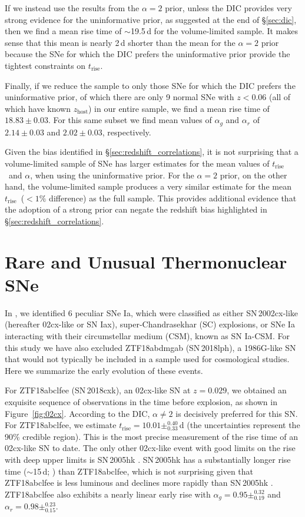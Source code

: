 \documentclass[twocolumn]{./aastex63}
\newcommand{\trise}{$t_\mathrm{rise}$}
\begin{document}
If we instead use the results from the $\alpha = 2$ prior, unless the DIC
provides very strong evidence for the uninformative prior, as suggested at the
end of \S\ref{sec:dic}, then we find a mean rise time of $\sim$19.5\,d for the
volume-limited sample. It makes sense that this mean is nearly 2\,d shorter
than the mean for the $\alpha=2$ prior because the SNe for which the DIC
prefers the uninformative prior provide the tightest constraints on \trise.

Finally, if we reduce the sample to only those SNe for which the DIC prefers
the uninformative prior, of which there are only 9 normal SNe with $z < 0.06$
(all of which have known $z_\mathrm{host}$) in our entire sample, we find a
mean rise time of $18.83 \pm 0.03$. For this same subset we find mean values
of $\alpha_g$ and $\alpha_r$ of $2.14 \pm 0.03$ and $2.02 \pm 0.03$,
respectively.

Given the bias identified in \S\ref{sec:redshift_correlations}, it is not
surprising that a volume-limited sample of SNe has larger estimates for the
mean values of \trise\ and $\alpha$, when using the uninformative prior. For
the $\alpha = 2$ prior, on the other hand, the volume-limited sample produces
a very similar estimate for the mean \trise\ ($< 1\%$ difference) as the full
sample. This provides additional evidence that the adoption of a strong prior
can negate the redshift bias highlighted in \S\ref{sec:redshift_correlations}.

\section{Rare and Unusual Thermonuclear SNe}\label{sec:rare}

In \citet{Yao19}, we identified 6 peculiar SNe Ia, which were classified as
either SN\,2002cx-like (hereafter 02cx-like or SN Iax), super-Chandrasekhar
(SC) explosions, or SNe Ia interacting with their circumstellar medium (CSM),
known as SN Ia-CSM. For this study we have also excluded ZTF18abdmgab
(SN\,2018lph), a 1986G-like SN that would not typically be included in a
sample used for cosmological studies. Here we summarize the early evolution of
these events.

For ZTF18abclfee (SN\,2018cxk), an 02cx-like SN at $z = 0.029$, we obtained an
exquisite sequence of observations in the time before explosion, as shown in
Figure~\ref{fig:02cx}. According to the DIC, $\alpha \ne 2$ is decisively
preferred for this SN. For ZTF18abclfee, we estimate \trise$ = 10.01
\pm^{0.40}_{0.33}$\,d (the uncertainties represent the 90\% credible region).
This is the most precise measurement of the rise time of an 02cx-like SN to
date. The only other 02cx-like event with good limits on the rise with deep
upper limits is SN\,2005hk \citep{Phillips07}. SN\,2005hk has a substantially
longer rise time ($\sim$15\,d; \citealt{Phillips07}) than ZTF18abclfee, which
is not surprising given that ZTF18abclfee is less luminous and declines more
rapidly than SN\,2005hk \citep{Miller17a,Yao19}. ZTF18abclfee also exhibits a
nearly linear early rise with $\alpha_g = 0.95 \pm^{0.32}_{0.19}$ and
$\alpha_r = 0.98 \pm^{0.23}_{0.15}$.
\end{document}
